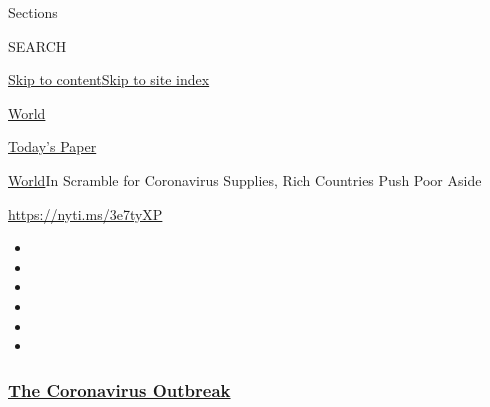 Sections

SEARCH

\protect\hyperlink{site-content}{Skip to
content}\protect\hyperlink{site-index}{Skip to site index}

\href{https://www.nytimes3xbfgragh.onion/section/world}{World}

\href{https://myaccount.nytimes3xbfgragh.onion/auth/login?response_type=cookie\&client_id=vi}{}

\href{https://www.nytimes3xbfgragh.onion/section/todayspaper}{Today's
Paper}

\href{/section/world}{World}\textbar{}In Scramble for Coronavirus
Supplies, Rich Countries Push Poor Aside

\url{https://nyti.ms/3e7tyXP}

\begin{itemize}
\item
\item
\item
\item
\item
\item
\end{itemize}

\hypertarget{the-coronavirus-outbreak}{%
\subsubsection{\texorpdfstring{\href{https://www.nytimes3xbfgragh.onion/news-event/coronavirus?name=styln-coronavirus-national\&region=TOP_BANNER\&block=storyline_menu_recirc\&action=click\&pgtype=Article\&impression_id=97e055b0-f1f3-11ea-861d-9f9fbf97bb3c\&variant=undefined}{The
Coronavirus
Outbreak}}{The Coronavirus Outbreak}}\label{the-coronavirus-outbreak}}

